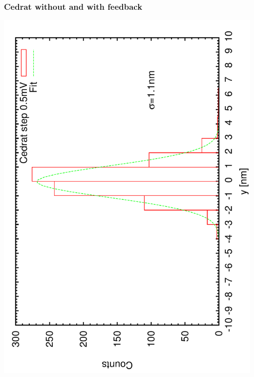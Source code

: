 \documentclass[a4paper,11pt]{book}
\begin{document}
\subsubsection{Cedrat without and with feedback}
\includegraphics[angle=-90,scale=0.20]{imagestep12.pdf}
\end{document}
